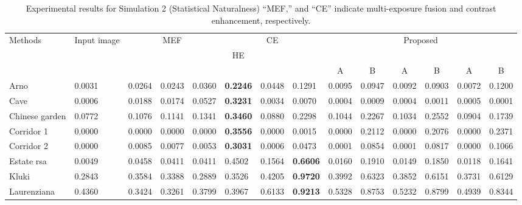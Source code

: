 \documentclass[paper]{ieice}
\begin{document}
%
\begin{table*}[!t]
  \centering
  \caption{Experimental results for Simulation 2 (Statistical Naturalness)
  ``MEF,'' and ``CE'' indicate
  multi-exposure fusion and contrast enhancement, respectively.}
  {\footnotesize
  \begin{tabular}{l|l|lll|lll|ll|ll|ll} \hline \hline
    \multirow{3}{*}{Methods} & \multirow{3}{10mm}{Input image} & \multicolumn{3}{c|}{MEF} &
    \multicolumn{3}{c|}{CE} & \multicolumn{6}{c}{Proposed}\\\cline{3-14}
    & & \multicolumn{1}{c}{\cite{mertens2009exposure}} &
    \multicolumn{1}{c}{\cite{sakai2015hybrid}} & \multicolumn{1}{c|}{\cite{nejati2017fast}} &
    \multicolumn{1}{c}{HE} & \multicolumn{1}{c}{\cite{zuiderveld1994contrast}} &
    \multicolumn{1}{c|}{\cite{wu2017contrast}} &
    \multicolumn{2}{c|}{\cite{mertens2009exposure}} &
    \multicolumn{2}{c|}{\cite{sakai2015hybrid}} &
    \multicolumn{2}{c}{\cite{nejati2017fast}}\\
    &&&&&&&& \multicolumn{1}{c}{A} & \multicolumn{1}{c|}{B} &
    \multicolumn{1}{c}{A} & \multicolumn{1}{c|}{B} & \multicolumn{1}{c}{A} &
    \multicolumn{1}{c}{B}\\
    \hdashline
Arno & 0.0031 & 0.0264 & 0.0243 & 0.0360 & \textbf{0.2246} & 0.0448 & 0.1291 & 0.0095 & 0.0947 & 0.0092 & 0.0903 & 0.0072 & 0.1200 \\
Cave & 0.0006 & 0.0188 & 0.0174 & 0.0527 & \textbf{0.3231} & 0.0034 & 0.0070 & 0.0004 & 0.0009 & 0.0004 & 0.0011 & 0.0005 & 0.0001 \\
Chinese garden & 0.0772 & 0.1076 & 0.1141 & 0.1341 & \textbf{0.3460} & 0.0880 & 0.2298 & 0.1044 & 0.2267 & 0.1034 & 0.2552 & 0.0904 & 0.1739 \\
Corridor 1 & 0.0000 & 0.0000 & 0.0000 & 0.0000 & \textbf{0.3556} & 0.0000 & 0.0015 & 0.0000 & 0.2112 & 0.0000 & 0.2076 & 0.0000 & 0.2371 \\
Corridor 2 & 0.0000 & 0.0085 & 0.0077 & 0.0053 & \textbf{0.3031} & 0.0006 & 0.0473 & 0.0001 & 0.0854 & 0.0001 & 0.0817 & 0.0000 & 0.1066 \\
Estate rsa & 0.0049 & 0.0458 & 0.0411 & 0.0411 & 0.4502 & 0.1564 & \textbf{0.6606} & 0.0160 & 0.1910 & 0.0149 & 0.1850 & 0.0118 & 0.1641 \\
Kluki & 0.2843 & 0.3584 & 0.3388 & 0.2889 & 0.3526 & 0.4205 & \textbf{0.9720} & 0.3992 & 0.6323 & 0.3852 & 0.6151 & 0.3731 & 0.6129 \\
Laurenziana & 0.4360 & 0.3424 & 0.3261 & 0.3799 & 0.3967 & 0.6133 & \textbf{0.9213} & 0.5328 & 0.8753 & 0.5232 & 0.8799 & 0.4939 & 0.8344 \\

\end{tabular}}
\end{table*}
\end{document}
